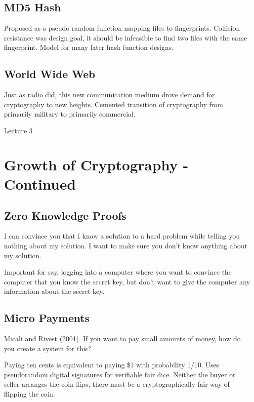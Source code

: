 \documentclass[psamsfonts]{amsart}
\begin{document}
\subsection{MD5 Hash}

Proposed as a pseudo random function mapping files to fingerprints. Collision resistance was design goal, it should be infeasible to find two files with the same fingerprint. Model for many later hash function designs.

\subsection{World Wide Web}

Just as radio did, this new communication medium drove demand for cryptography to new heights. Cemented transition of cryptography from primarily military to primarily commercial.


\newpage
\Large{Lecture 3}


\maketitle

\section{Growth of Cryptography - Continued}

\subsection{Zero Knowledge Proofs}

I can convince you that I know a solution to a hard problem while telling you nothing about my solution. I want to make sure you don't know anything about my solution.

Important for say, logging into a computer where you want to convince the computer that you know the secret key, but don't want to give the computer any information about the secret key.

\subsection{Micro Payments}

Micali and Rivest (2001). If you want to pay small amounts of money, how do you create a system for this?

Paying ten cents is equivalent to paying \$1 with probability 1/10. Uses pseudorandom digital signatures for verifiable fair dice. Neither the buyer or seller arranges the coin flips, there must be a cryptographically fair way of flipping the coin.
\end{document}
